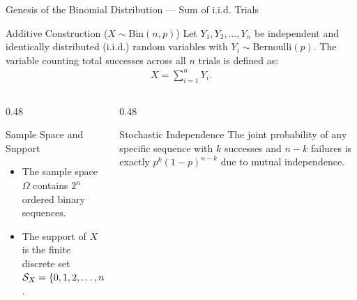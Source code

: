 \documentclass[aspectratio=169,xcolor={dvipsnames,table}]{beamer}
\begin{document}
\begin{frame}{Genesis of the Binomial Distribution --- Sum of i.i.d. Trials}
	\begin{block}{Additive Construction ($X \sim \text{Bin}(n, p)$)}
		\small
		Let $Y_1, Y_2, \dots, Y_n$ be independent and identically distributed (i.i.d.) random variables with $Y_i \sim \text{Bernoulli}(p)$. The variable counting total successes across all $n$ trials is defined as:
		\begin{align*}
			X = \sum_{i=1}^n Y_i.
		\end{align*}
	\end{block}
	\vspace{-0.15cm}
	\begin{columns}[T]
		\begin{column}{0.48\textwidth}
			\begin{exampleblock}{Sample Space and Support}
				\footnotesize
				\begin{itemize}
					\itemsep=0.04cm
					\item The sample space $\Omega$ contains $2^n$ ordered binary sequences.
					\item The support of $X$ is the finite discrete set $\mathcal{S}_X = \left\{ 0, 1, 2, \dots, n \right\}$.
				\end{itemize}
			\end{exampleblock}
		\end{column}
		\begin{column}{0.48\textwidth}
			\begin{alertblock}{Stochastic Independence}
				\footnotesize
				The joint probability of any specific sequence with $k$ successes and $n-k$ failures is exactly $p^k (1-p)^{n-k}$ due to mutual independence.
			\end{alertblock}
		\end{column}
	\end{columns}
\end{frame}
\end{document}
